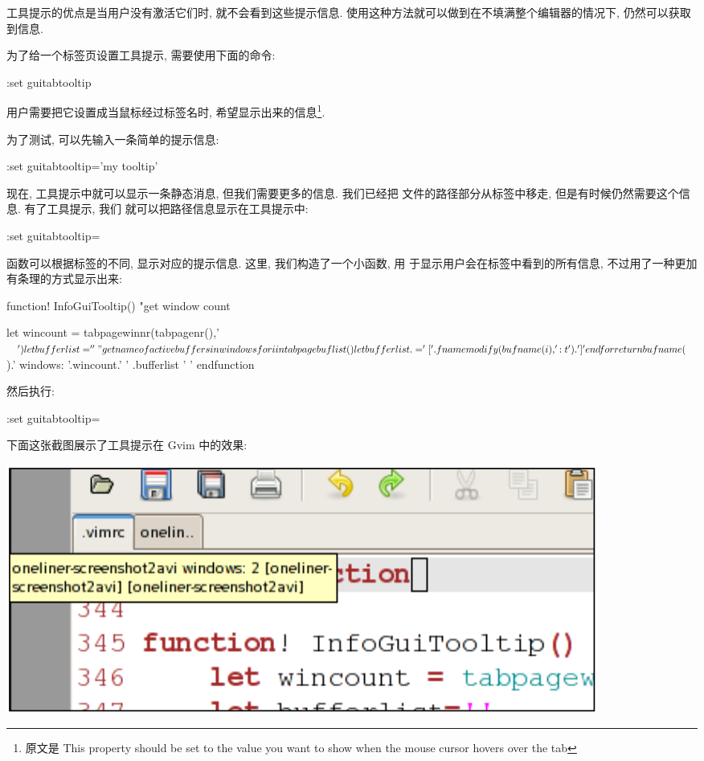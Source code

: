 \begin{warning}
工具提示的优点是当用户没有激活它们时,
就不会看到这些提示信息. 使用这种方法就可以做到在不填满整个编辑器的情况下, 
仍然可以获取到信息.

为了给一个标签页设置工具提示, 需要使用下面的命令:
\begin{vimcmd}
:set guitabtooltip
\end{vimcmd}
用户需要把它设置成当鼠标经过标签名时, 希望显示出来的信息\footnote{原文是
 This property should be set to the value you want to show when the mouse
 cursor hovers over the tab}.

为了测试, 可以先输入一条简单的提示信息:
\begin{vimcmd}
:set guitabtooltip='my tooltip'
\end{vimcmd}
现在, 工具提示中就可以显示一条静态消息, 但我们需要更多的信息. 我们已经把
文件的路径部分从标签中移走, 但是有时候仍然需要这个信息. 有了工具提示, 我们 
就可以把路径信息显示在工具提示中:
\begin{vimcmd}
:set guitabtooltip=%
\end{vimcmd}

函数可以根据标签的不同, 显示对应的提示信息. 这里, 我们构造了一个小函数, 用
于显示用户会在标签中看到的所有信息, 不过用了一种更加有条理的方式显示出来:
\begin{vimscript}
function! InfoGuiTooltip()
    "get window count
\end{vimscript}
\begin{vimscript}
    let wincount = tabpagewinnr(tabpagenr(),'$')
    let bufferlist=''
   "get name of active buffers in windows
    for i in tabpagebuflist()
        let bufferlist .= '['.fnamemodify(bufname(i),':t').'] ' 
    endfor
    return bufname($).' windows: '.wincount.' ' .bufferlist ' '
endfunction
\end{vimscript}
然后执行:
\begin{vimcmd}
:set guitabtooltip=%
\end{vimcmd}
下面这张截图展示了工具提示在 Gvim 中的效果:
\begin{center}
    \includegraphics[scale=0.6]{images/page37.png}
\end{center}


\end{warning}
